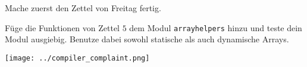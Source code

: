 \documentclass{../uebungszettel}
\begin{document}
\noindent

Mache zuerst den Zettel von Freitag fertig.



\begin{aufg}
F\"uge die Funktionen von Zettel $5$ dem Modul \verb|arrayhelpers| hinzu und teste dein Modul ausgiebig.
Benutze dabei sowohl statische als auch dynamische Arrays. 
\end{aufg}





\center
\texttt{[image: ../compiler\_complaint.png]}
\end{document}
